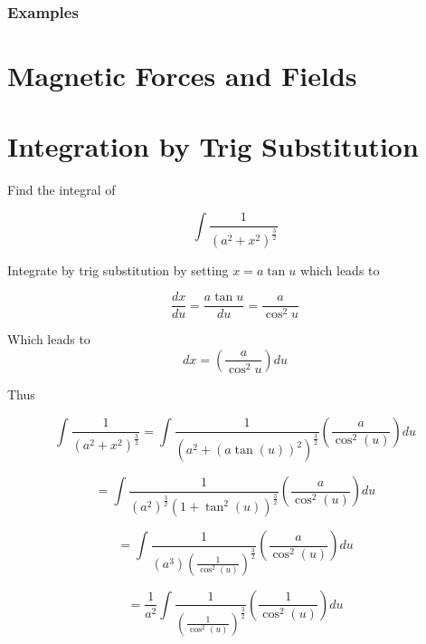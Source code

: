 \documentclass[14pt]{memoir}
\begin{document}
\subsection{Examples}

\chapter{Magnetic Forces and Fields}

\appendix

\chapter{Integration by Trig Substitution}
\label{sec:trigsub}

Find the integral of 

\begin{equation}
\int \frac{1}{(a^2 + x^2)^{\frac{3}{2}}}
\end{equation}

Integrate by trig substitution by setting $x = a\tan{u}$ which leads to 

\begin{equation}
\frac{dx}{du} = \frac{a \tan{u}}{du} = \frac{a}{\cos^2{u}}
\end{equation}

Which leads to 
\begin{equation}
dx = ( \frac{a}{\cos^2{u}}) du 
\end{equation}

Thus

\begin{equation}
\int \frac{1}{(a^2 + x^2)^{\frac{3}{2}}} =  \int \frac{1}{(a^2 + (a\tan{(u)})^2)^{\frac{3}{2}}} ( \frac{a}{\cos^2{(u)}}) du
\end{equation}

\begin{equation}
=  \int \frac{1}{(a^2)^{\frac{3}{2}} (1 + \tan^2{(u)})^{\frac{3}{2}}} ( \frac{a}{\cos^2{(u)}}) du
\end{equation}

\begin{equation}
=  \int \frac{1}{(a^3)(\frac{1}{\cos^2(u)})^{\frac{3}{2}}} ( \frac{a}{\cos^2{(u)}}) du
\end{equation}

\begin{equation}
=  \frac{1}{a^2} \int \frac{1}{(\frac{1}{\cos^2(u)})^{\frac{3}{2}}} ( \frac{1}{\cos^2{(u)}}) du
\end{equation}
\end{document}
